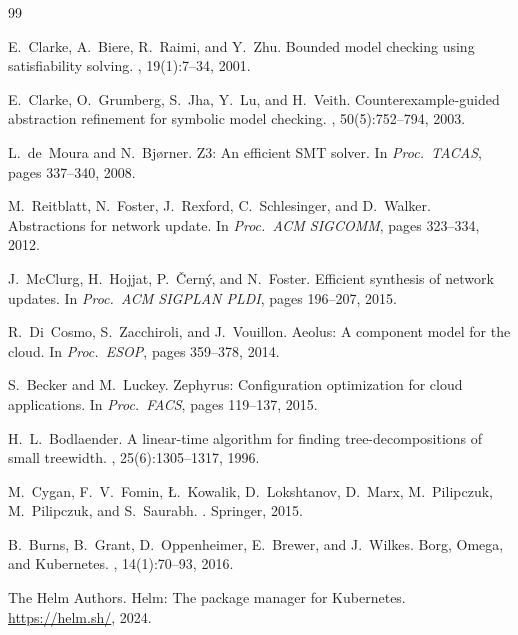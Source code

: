 \documentclass[10pt,twocolumn]{article}
\begin{document}

\begin{thebibliography}{99}

E.~Clarke, A.~Biere, R.~Raimi, and Y.~Zhu.
\newblock Bounded model checking using satisfiability solving.
, 19(1):7--34, 2001.

E.~Clarke, O.~Grumberg, S.~Jha, Y.~Lu, and H.~Veith.
\newblock Counterexample-guided abstraction refinement for symbolic model checking.
, 50(5):752--794, 2003.

L.~de~Moura and N.~Bj{\o}rner.
\newblock Z3: An efficient {SMT} solver.
\newblock In {\em Proc.\ TACAS}, pages 337--340, 2008.

M.~Reitblatt, N.~Foster, J.~Rexford, C.~Schlesinger, and D.~Walker.
\newblock Abstractions for network update.
\newblock In {\em Proc.\ ACM SIGCOMM}, pages 323--334, 2012.

J.~McClurg, H.~Hojjat, P.~\v{C}ern\'{y}, and N.~Foster.
\newblock Efficient synthesis of network updates.
\newblock In {\em Proc.\ ACM SIGPLAN PLDI}, pages 196--207, 2015.

R.~Di~Cosmo, S.~Zacchiroli, and J.~Vouillon.
\newblock Aeolus: {A} component model for the cloud.
\newblock In {\em Proc.\ ESOP}, pages 359--378, 2014.

S.~Becker and M.~Luckey.
\newblock Zephyrus: {C}onfiguration optimization for cloud applications.
\newblock In {\em Proc.\ FACS}, pages 119--137, 2015.

H.~L.~Bodlaender.
\newblock A linear-time algorithm for finding tree-decompositions of small treewidth.
, 25(6):1305--1317, 1996.

M.~Cygan, F.~V.~Fomin, {\L}.~Kowalik, D.~Lokshtanov, D.~Marx, M.~Pilipczuk, M.~Pilipczuk, and S.~Saurabh.
.
\newblock Springer, 2015.

B.~Burns, B.~Grant, D.~Oppenheimer, E.~Brewer, and J.~Wilkes.
\newblock Borg, {O}mega, and {K}ubernetes.
, 14(1):70--93, 2016.

{The Helm Authors}.
\newblock Helm: The package manager for {K}ubernetes.
\newblock \url{https://helm.sh/}, 2024.


\end{thebibliography}
\end{document}

